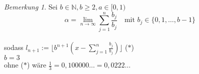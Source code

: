 \documentclass[12pt,a4paper,titlepage]{article} %
\theoremstyle{definition}
\theoremstyle{remark}
\newtheorem*{bem}{Bemerkung}
\newcommand{\N}{\mathbb{N}}
\newcommand{\limes}[1]{\lim\limits_{#1\rightarrow\infty}}
\begin{document}
	\begin{bem}
		Sei \(b \in \N, b \geq 2, a \in [0, 1)\)\\
		\[\alpha = \limes{n} \sum_{j = 1}^{n} \frac{b_j}{b_j} \quad \text{mit } b_j \in \{0,1,\dots,b-1\}\]\\
		sodass \(l_{n+1} := \lfloor b^{n+1}(x-\sum_{j=1}^{n} \frac{b_j}{b_j})\rfloor\) (\(*\))\\
		\(b=3\)\\
		ohne (\(*\)) wäre \(\frac{1}{3} = 0,100000\dots = 0,0222\dots\)
	\end{bem}
\end{document}
